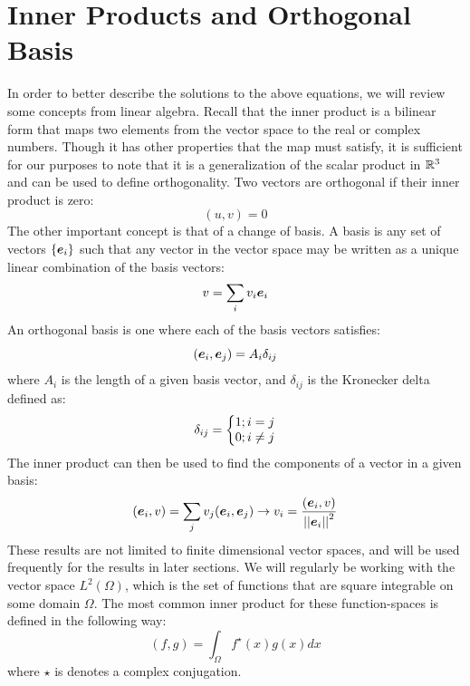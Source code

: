 \documentclass{article}
\begin{document}
\section{Inner Products and Orthogonal Basis}
In order to better describe the solutions to the above equations, we will review some concepts from linear algebra. Recall that the inner product is a bilinear form that maps two elements from the vector space to the real or complex numbers. Though it has other properties that the map must satisfy, it is sufficient for our purposes to note that it is a generalization of the scalar product in $\mathbb{R}^3$ and can be used to define orthogonality. Two vectors are orthogonal if their inner product is zero:
\begin{equation}
  (u,v)=0
\end{equation}
The other important concept is that of a change of basis. A basis is any set of vectors $\{\bm{e}_{i}\}$ such that any vector in the vector space may be written as a unique linear combination of the basis vectors:
\begin{equation}
  v = \sum_{i} v_i \bm{e}_{i}
\end{equation}
An orthogonal basis is one where each of the basis vectors satisfies:
\begin{equation}
  (\bm{e}_{i},\bm{e}_{j})= A_i \delta_{ij}
\end{equation}
where $A_i$ is the length of a given basis vector, and $\delta_{ij}$ is the Kronecker delta defined as:
\begin{equation}
  \delta_{ij} = \left\{\begin{matrix}
    1; i = j \\
    0; i \neq j
   \end{matrix}\right.
\end{equation}
The inner product can then be used to find the components of a vector in a given basis:
\begin{equation}
  (\bm{e}_{i},v)=\sum_{j} v_j (\bm{e}_{i},\bm{e}_{j})\rightarrow v_i = \frac{(\bm{e}_{i},v)}{\left|\left| \bm{e}_{i}\right|\right|^2}
\end{equation}
These results are not limited to finite dimensional vector spaces, and will be used frequently for the results in later sections. We will regularly be working with the vector space $L^2(\Omega)$, which is the set of functions that are square integrable on some domain $\Omega$. The most common inner product for these function-spaces is defined in the following way:
\begin{equation}
  \boxed{
    (f,g) = \int_\Omega f^\star(x) g(x)dx
  }
\end{equation}
where $\star$ is denotes a complex conjugation. 
\end{document}
